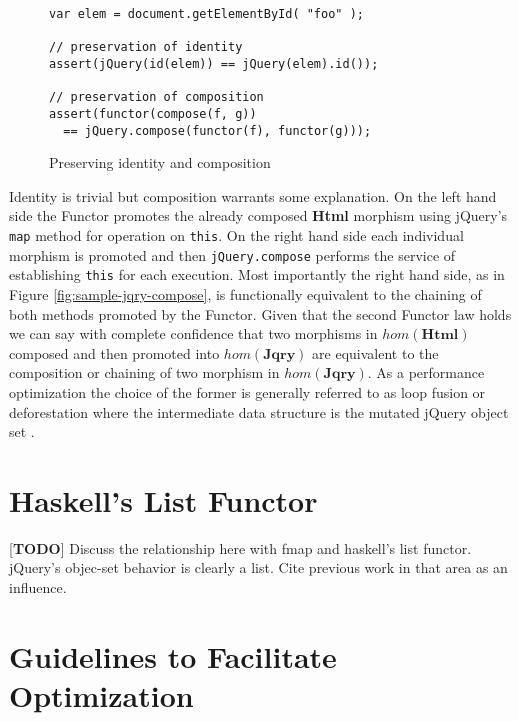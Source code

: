 \documentclass[preprint]{sigplanconf}
\begin{document}
\begin{figure}[!ht]
\small
\begin{verbatim}
var elem = document.getElementById( "foo" );

// preservation of identity
assert(jQuery(id(elem)) == jQuery(elem).id());

// preservation of composition
assert(functor(compose(f, g))
  == jQuery.compose(functor(f), functor(g)));
\end{verbatim}
\nocaptionrule \caption{Preserving identity and composition}
\label{fig:id-and-compose}
\end{figure}

Identity is trivial but composition warrants some explanation. On the left hand side the Functor promotes the already composed \textbf{Html} morphism using jQuery's \verb|map| method for operation on \verb|this|. On the right hand side each individual morphism is promoted and then \verb|jQuery.compose| performs the service of establishing \verb|this| for each execution. Most importantly the right hand side, as in Figure \ref{fig:sample-jqry-compose}, is functionally equivalent to the chaining of both methods promoted by the Functor. Given that the second Functor law holds we can say with complete confidence that two morphisms in \begin{math}hom(\mathbf{Html})\end{math} composed and then promoted into \begin{math}hom(\mathbf{Jqry})\end{math} are equivalent to the composition or chaining of two morphism in \begin{math}hom(\mathbf{Jqry})\end{math}. As a performance optimization the choice of the former is generally referred to as loop fusion or deforestation where the intermediate data structure is the mutated jQuery object set \cite{bib:deforestation}.

\section{Haskell's List Functor}

[\textbf{TODO}] Discuss the relationship here with fmap and haskell's list functor. jQuery's objec-set behavior is clearly a list. Cite previous work in that area as an influence.

\section{Guidelines to Facilitate Optimization}
\end{document}
